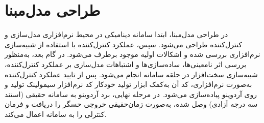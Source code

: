 \section{طراحی مدل‌مبنا}\label{model_base}
در طراحی مدل‌مبنا، ابتدا سامانه دینامیكی در محیط نرم‌افزاری مدل‌سازی و کنترل‌کننده طراحی می‌شود. سپس،  عملكرد کنترل‌کننده با استفاده از شبیه‌سازی نرم‌افزاری بررسی شده و اشكالات اولیه موجود برطرف می‌شود. در گام بعد، به‌منظور بررسی اثر نامعینی‌ها، ساده‌سازی‌ها و اشتباهات مدل‌سازی بر عملكرد کنترل‌کننده، شبیه‌سازی سخت‌افزار در حلقه سامانه
انجام می‌شود. پس از تایید عملكرد کنترل‌کننده به‌صورت نرم‌افزاری، کد آن به‌کمک ابزار تولید خودکار کد نرم‌افزار سیمولینک تولید و روی آردوینو پیاده‌سازی می‌شود.
 در مرحله نهایی، برد آردوینو به سامانه حقیقی (استند سه درجه آزادی) وصل شده، به‌صورت
زمان‌حقیقی خروجی حسگر را دریافت و فرمان کنترلی را به سامانه اعمال می‌کند.
